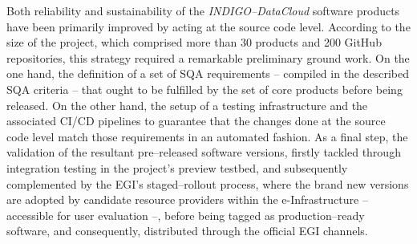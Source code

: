 
Both reliability and sustainability of the {\sl INDIGO--DataCloud} software products 
have been primarily improved by acting at the source code level. According to the 
size of the project, which comprised more than 30 products and 200 GitHub repositories, 
this strategy required a remarkable preliminary ground work. On the one hand, the 
definition of a set of SQA requirements -- compiled in the described SQA criteria 
-- that ought to be fulfilled by the set of core products before being
released. On the other hand, the setup of a testing infrastructure and
the associated CI/CD pipelines to guarantee that the changes done at the source code
level match
those requirements in an automated fashion. As a final step, the validation of the 
resultant pre--released software versions, firstly tackled through integration testing in
the project's preview testbed, and subsequently complemented by the EGI's 
staged--rollout process, where the brand new versions are adopted by candidate resource
providers within the e-Infrastructure -- accessible for user evaluation --, before being
tagged as production--ready software, and consequently, distributed through the official
EGI channels.

